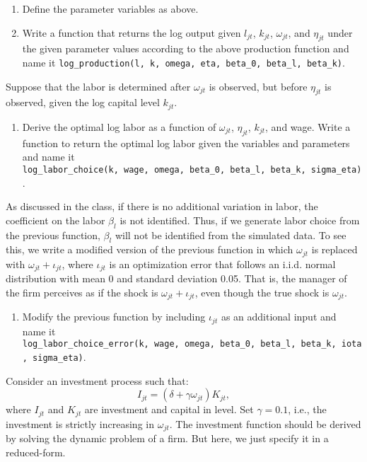 \documentclass[
]{book}
\providecommand{\tightlist}{%
  \setlength{\itemsep}{0pt}\setlength{\parskip}{0pt}}
\begin{document}
\begin{enumerate}
\def\labelenumi{\arabic{enumi}.}
\item
  Define the parameter variables as above.
\item
  Write a function that returns the log output given \(l_{jt}\), \(k_{jt}\), \(\omega_{jt}\), and \(\eta_{jt}\) under the given parameter values according to the above production function and name it \texttt{log\_production(l,\ k,\ omega,\ eta,\ beta\_0,\ beta\_l,\ beta\_k)}.
\end{enumerate}

Suppose that the labor is determined after \(\omega_{jt}\) is observed, but before \(\eta_{jt}\) is observed, given the log capital level \(k_{jt}\).

\begin{enumerate}
\def\labelenumi{\arabic{enumi}.}
\setcounter{enumi}{2}
\tightlist
\item
  Derive the optimal log labor as a function of \(\omega_{jt}\), \(\eta_{jt}\), \(k_{jt}\), and wage. Write a function to return the optimal log labor given the variables and parameters and name it \texttt{log\_labor\_choice(k,\ wage,\ omega,\ beta\_0,\ beta\_l,\ beta\_k,\ sigma\_eta)}.
\end{enumerate}

As discussed in the class, if there is no additional variation in labor, the coefficient on the labor \(\beta_l\) is not identified. Thus, if we generate labor choice from the previous function, \(\beta_l\) will not be identified from the simulated data. To see this, we write a modified version of the previous function in which \(\omega_{jt}\) is replaced with \(\omega_{jt} + \iota_{jt}\), where \(\iota_{jt}\) is an optimization error that follows an i.i.d. normal distribution with mean 0 and standard deviation 0.05. That is, the manager of the firm perceives as if the shock is \(\omega_{jt} + \iota_{jt}\), even though the true shock is \(\omega_{jt}\).

\begin{enumerate}
\def\labelenumi{\arabic{enumi}.}
\setcounter{enumi}{3}
\tightlist
\item
  Modify the previous function by including \(\iota_{jt}\) as an additional input and name it \texttt{log\_labor\_choice\_error(k,\ wage,\ omega,\ beta\_0,\ beta\_l,\ beta\_k,\ iota,\ sigma\_eta)}.
\end{enumerate}

Consider an investment process such that:
\[
I_{jt} = (\delta + \gamma \omega_{jt}) K_{jt},
\]
where \(I_{jt}\) and \(K_{jt}\) are investment and capital in level. Set \(\gamma = 0.1\), i.e., the investment is strictly increasing in \(\omega_{jt}\). The investment function should be derived by solving the dynamic problem of a firm. But here, we just specify it in a reduced-form.
\end{document}
